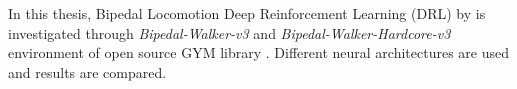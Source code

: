 In this thesis, Bipedal Locomotion Deep Reinforcement Learning (DRL) by is investigated through \textit{Bipedal-Walker-v3} \cite{noauthor_bipedalwalker-v2_2021} and \textit{Bipedal-Walker-Hardcore-v3} \cite{noauthor_bipedalwalkerhardcore-v2_2021} environment of open source GYM library \cite{brockman_openai_2016}. Different neural architectures are used and results are compared. 